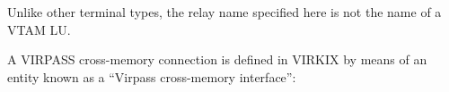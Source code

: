 \documentclass[letterpaper,10pt,english]{sphinxmanual}
\begin{document}
Unlike other terminal types, the relay name specified here is not the name of a VTAM LU.


A VIRPASS cross-memory connection is defined in VIRKIX by means of an entity known as a “Virpass cross-memory interface”:

\begin{sphinxVerbatim}[commandchars=\\\{\}]
                
                                                                
   

\end{sphinxVerbatim}
\end{document}
